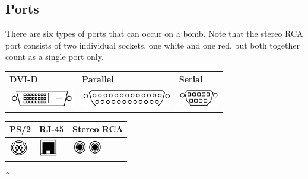 \subsection*{Ports}\label{subsec:ports}
There are six types of ports that can occur on a bomb. Note that the stereo
RCA port consists of two individual sockets, one white and one red, but
both together count as a single port only.
\begin{table}[h]
  \centering
  \begin{tabular}{|
      >{\centering\arraybackslash}p{} |
      >{\centering\arraybackslash}p{} |
      >{\centering\arraybackslash}p{} |}
    \hline
    \cellcolor{lightgray} DVI-D &
    \cellcolor{lightgray} Parallel &
    \cellcolor{lightgray} Serial \\ \hline
    \vspace{0cm}
    \includegraphics[height=0.8cm,valign=b]{modules/0_explanation/ew_dvi-d} &
    \vspace{0cm}
    \includegraphics[height=0.8cm,valign=b]{modules/0_explanation/ew_parallel} &
    \vspace{0cm}
    \includegraphics[height=0.8cm,valign=b]{modules/0_explanation/ew_serial} \\ \hline
  \end{tabular}\label{tab:portsA}
\end{table}
\begin{table}[h]
  \centering
  \begin{tabular}{|
      >{\centering\arraybackslash}p{} |
      >{\centering\arraybackslash}p{} |
      >{\centering\arraybackslash}p{} |}
    \hline
    \cellcolor{lightgray} PS/2 &
    \cellcolor{lightgray} RJ-45 &
    \cellcolor{lightgray} Stereo RCA \\ \hline
    \vspace{0cm}
    \includegraphics[height=0.8cm]{modules/0_explanation/ew_ps2} &
    \vspace{0cm}
    \includegraphics[height=0.8cm]{modules/0_explanation/ew_rj-45} &
    \vspace{0cm}
    \includegraphics[height=0.8cm]{modules/0_explanation/ew_stereo} \\ \hline
  \end{tabular}\label{tab:portsB}
\end{table}^
